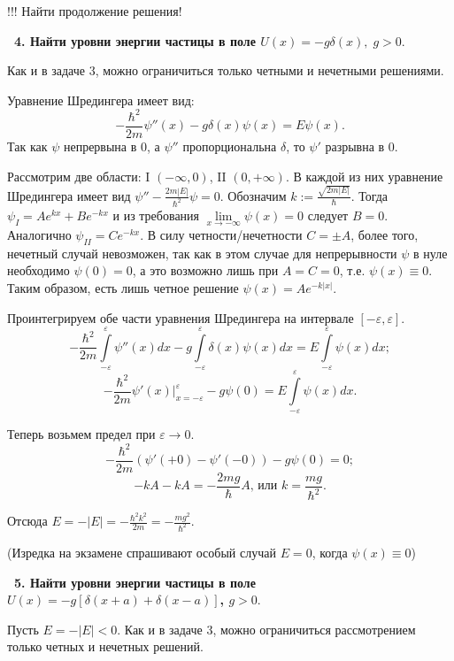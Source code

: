 \documentclass[a4paper,12pt]{article}
\begin{document}
!!! Найти продолжение решения!

\noindent\textbf{~4. Найти уровни энергии частицы в поле $U\left( x
\right) = - g\delta \left( x \right),\;g > 0.$}

Как и в задаче 3, можно ограничиться только четными и нечетными решениями.

Уравнение Шредингера имеет вид:
%
$$-\frac{\hbar^2}{2m}\psi''(x)-g\delta(x)\psi(x)=E\psi(x).$$
%
Так как $\psi$ непрервына в 0, а $\psi''$ пропорциональна $\delta$, то
$\psi'$ разрывна в 0.

Рассмотрим две области: I $(-\infty,0)$, II $(0,+\infty)$.
В каждой из них уравнение Шре\-дин\-ге\-ра
имеет вид $\psi''-\frac{2m|E|}{\hbar^2}
\psi=0$. Обозначим $k:=\frac{\sqrt{2m|E|}}\hbar$. Тогда $\psi_I=Ae^{kx}+
Be^{-kx}$ и из требования $\lim\limits_{x\to-\infty}\psi(x)=0$
следует $B=0$. Аналогично
$\psi_{II}=Ce^{-kx}$. В силу четности/нечетности $C=\pm A$, более того,
нечетный случай невозможен, так как в этом случае для непрерывности $\psi$
в нуле необходимо $\psi(0)=0$, а это возможно лишь при $A=C=0$, т.е.
$\psi(x)\equiv0$. Таким образом, есть лишь четное решение $\psi(x)=Ae^{-k|x|}$.

Проинтегрируем обе части уравнения Шредингера
%
%
на интервале $[-\varepsilon,\varepsilon]$.
%
  $$-\frac{\hbar^2}{2m}
     \int\limits_{-\varepsilon}^\varepsilon\psi''(x)dx-
    g\int\limits_{-\varepsilon}^\varepsilon\delta(x)\psi(x)dx=
    E\int\limits_{-\varepsilon}^\varepsilon\psi(x)dx;$$
  $$-\frac{\hbar^2}{2m}\psi'(x)\bigg|_{x=-\varepsilon}^\varepsilon-
    g\psi(0)=E\int\limits_{-\varepsilon}^\varepsilon\psi(x)dx.$$

Теперь возьмем предел при $\varepsilon\to0$.
%
  $$-\frac{\hbar^2}{2m}(\psi'(+0)-\psi'(-0))-g\psi(0)=0;$$
  $$-kA-kA=-\frac{2mg}\hbar A\mbox{, или }k=\frac{mg}{\hbar^2}.$$

Отсюда $E=-|E|=-\frac{\hbar^2k^2}{2m}=-\frac{mg^2}{\hbar^2}$.

(Изредка на экзамене спрашивают особый случай $E=0$, когда $\psi(x)\equiv0$)

\noindent\textbf{~5. Найти уровни энергии частицы в поле $U\left( x
\right) = - g\left[ {\delta \left( {x + a} \right) + \delta \left(
{x - a} \right)} \right]$, $g > 0.$}

Пусть $E=-|E|<0$.
Как и в задаче 3, можно ограничиться рассмотрением только четных и нечетных
решений.
\end{document}
